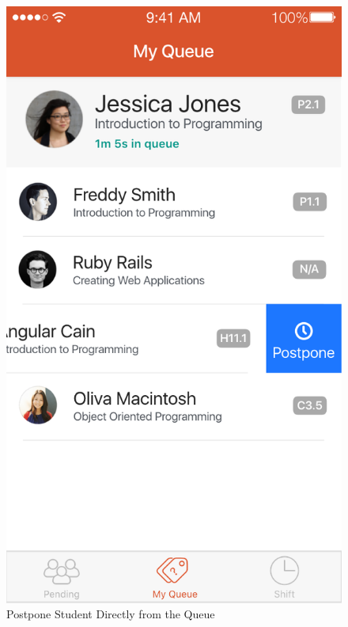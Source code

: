 \documentclass[a4paper,12pt]{article}
\begin{document}
\begin{figure}[p]
\centering
\includegraphics[scale=0.5]{4a2957343a.png}
\caption{Postpone Student Directly from the Queue}
\label{5}
\end{figure}
\end{document}
